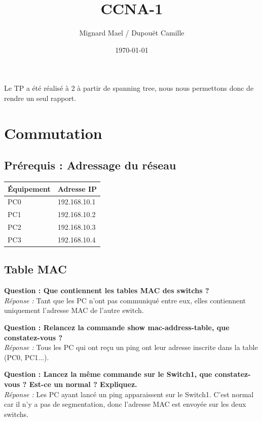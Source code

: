 \documentclass[a4paper,12pt]{article}
\title{CCNA-1}
\author{Mignard Mael / Dupouët Camille}
\date{\today}
\begin{document}
\maketitle
Le TP a été réalisé à 2 à partir de spanning tree, nous nous permettons donc de rendre un seul rapport.
\tableofcontents
\newpage

\section{Commutation}

\subsection{Prérequis : Adressage du réseau}

\begin{center}
\begin{tabular}{ll}
\toprule
\textbf{Équipement} & \textbf{Adresse IP} \\
\midrule
PC0 & 192.168.10.1 \\
PC1 & 192.168.10.2 \\
PC2 & 192.168.10.3 \\
PC3 & 192.168.10.4 \\
\bottomrule
\end{tabular}
\end{center}
\vspace{1em}

\subsection{Table MAC}

\textbf{Question : Que contiennent les tables MAC des switchs ?} \\
\textit{Réponse :} Tant que les PC n'ont pas communiqué entre eux, elles contiennent uniquement l'adresse MAC de l'autre switch.
\vspace{1em}

\textbf{Question : Relancez la commande show mac-address-table, que constatez-vous ?} \\
\textit{Réponse :} Tous les PC qui ont reçu un ping ont leur adresse inscrite dans la table (PC0, PC1...).
\vspace{1em}

\textbf{Question : Lancez la même commande sur le Switch1, que constatez-vous ? Est-ce un normal ? Expliquez.} \\
\textit{Réponse :} Les PC ayant lancé un ping apparaissent sur le Switch1. C'est normal car il n'y a pas de segmentation, donc l'adresse MAC est envoyée sur les deux switchs.
\vspace{1em}
\end{document}
